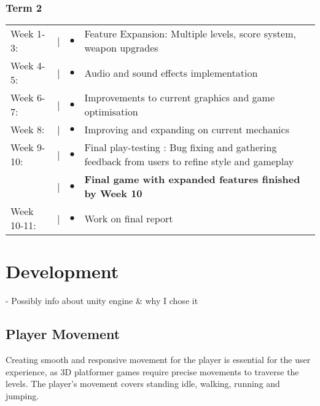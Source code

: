 \documentclass[]{final_report}
\begin{document}
\subsection{Term 2}
\begin{tabular}{@{}p{2cm}@{}>{\raggedright\arraybackslash}p{0.5cm}@{}>{\raggedright\arraybackslash}p{0.5cm}@{}p{12cm}}
Week 1-3: & \textcolor{black}{|} & $\bullet$ & Feature Expansion: Multiple levels, score system, weapon upgrades\\
Week 4-5: & \textcolor{black}{|} & $\bullet$ & Audio and sound effects implementation \\
Week 6-7: & \textcolor{black}{|} & $\bullet$ &  Improvements to current graphics and game optimisation \\
Week 8: & \textcolor{black}{|} & $\bullet$ & Improving and expanding on current mechanics \\
Week 9-10: & \textcolor{black}{|} & $\bullet$ & Final play-testing : Bug fixing and gathering feedback from users to refine style and gameplay\\
& \textcolor{black}{|} & $\bullet$ & \textbf{Final game with expanded features finished by Week 10} \\
Week 10-11: & \textcolor{black}{|} & $\bullet$ & Work on final report \\
\end{tabular}
\chapter{Development}
 - Possibly info about unity engine \& why I chose it
\section{Player Movement}
Creating smooth and responsive movement for the player is essential for the user experience, as 3D platformer games require precise movements to traverse the levels. The player's movement covers standing idle, walking, running and jumping. 
\end{document}
